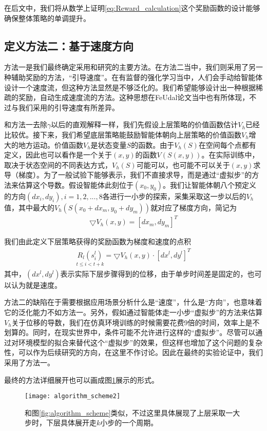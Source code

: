在后文中，我们将从数学上证明\eqref{eq:Reward_calculation}这个奖励函数的设计能够确保整体策略的单调提升。

\subsection{定义方法二：基于速度方向}
方法一是我们最终确定采用和研究的主要方法。在方法二当中，我们则采用了另一种辅助奖励的方法，``引导速度''。在有监督的强化学习当中，人们会手动给智能体设计一个速度流，但这种方法显然是不够泛化的。我们希望能够设计出一种根据稀疏的奖励，自动生成速度流的方法。这种思想在FeUdal论文\cite{feudal}当中也有所体现，不过与我们采用的引导速度有所差异。

和方法一去除$\gamma$以后的直观解释一样，我们先假设上层策略的价值函数估计$V_h$已经比较优。接下来，我们希望底层策略能鼓励智能体朝向上层策略的价值函数$V_h$增大的地方运动。价值函数$V_h$是状态变量$S$的函数。由于$V_h(S)$在空间每个点都有定义，因此也可以看作是一个关于$(x, y)$的函数$V(S(x, y))$。在实际训练中，取决于状态空间的不同表达方式，$V_h(S)$可能可以，也可能不可以关于$(x, y)$求导（梯度）。为了一般试验下能够表示，我们不直接求导，而是通过``虚拟步''的方法来估算这个导数。假设智能体此刻位于$(x_0, y_0)$。我们让智能体朝八个预定义的方向$(dx_i, dy_i), i = 1,2,...,8$各进行一小步的探索，采集采取这一步以后的$V_h$值，其中最大的$V_h(S(x_0 + dx_m, y_0 + dy_m))$就对应了梯度方向，简记为
\begin{align}
  \bigtriangledown V_h(x, y) = [dx_m, dy_m]^T
\end{align}

我们由此定义下层策略获得的奖励函数为梯度和速度的点积
\begin{align}
  	\underset{t\leq  i < t+k}{R_l(s_i^l)} = \bigtriangledown V_h(x, y) \cdot [dx^l, dy^l]^T
	\label{eq:Reward_calculation2}
\end{align}
其中，$(dx^l, dy^l)$表示实际下层步骤得到的位移，由于单步时间差是固定的，也可以认为就是速度。

方法二的缺陷在于需要根据应用场景分析什么是``速度''，什么是``方向''，也意味着它的泛化能力不如方法一。另外，假如通过智能体走一小步``虚拟步''的方法来估算$V_h$关于位移的导数，我们在仿真环境训练的时候需要花费9倍的时间，效率上是不划算的。同时，在现实世界中，条件可能不允许进行这样的``虚拟步''。尽管可以通过对环境模型的拟合来替代这个``虚拟步''的效果，但这样也增加了这个问题的复杂性，可以作为后续研究的方向，在这里不作讨论。因此在最终的实验论证中，我们采用了方法一。

最终的方法详细展开也可以画成图\ref{fig:algorithm_scheme2}展示的形式。
      \begin{figure}[h] %
        \centering
        \texttt{[image: algorithm\_scheme2]}
        \caption{和图\ref{fig:algorithm_scheme}类似，不过这里具体展现了上层采取一大步时，下层具体展开走$k$小步的一个周期。}
        \label{fig:algorithm_scheme2}
      \end{figure}

